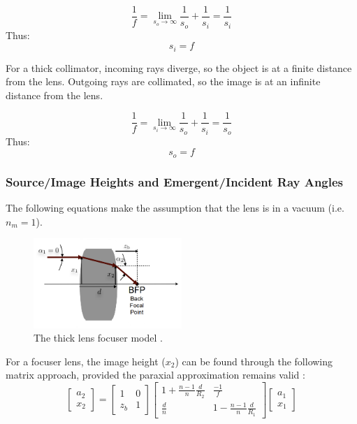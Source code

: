 \begin{equation}
    \frac{1}{f} = \lim_{s_o\to\infty} \frac{1}{s_o} + \frac{1}{s_i} = \frac{1}{s_i}
\end{equation}
Thus:
\begin{equation}
    s_i = f
\end{equation}

For a thick collimator, incoming rays diverge, so the object is at a finite distance from the lens. Outgoing rays are collimated, so the image is at an infinite distance from the lens.

\begin{equation}
    \frac{1}{f} = \lim_{s_i\to\infty} \frac{1}{s_o} + \frac{1}{s_i} = \frac{1}{s_o}
\end{equation}
Thus:
\begin{equation}
    s_o = f
\end{equation}

\subsubsection{Source/Image Heights and Emergent/Incident Ray Angles}

The following equations make the assumption that the lens is in a vacuum (i.e. $n_m=1$).

\begin{figure}[H]
\centering
\includegraphics[width=0.5\textwidth]{figures/thick-lens-focuser.png}
\caption{The thick lens focuser model \cite{MIT_Lec5}.}
\label{fig:thick-lens-focuser-model}
\end{figure}

For a focuser lens, the image height ($x_2$) can be found through the following matrix approach, provided the paraxial approximation remains valid \cite{MIT_Lec4, MIT_Lec5}:
\[ 
\begin{bmatrix} a_2\\x_2 \end{bmatrix} =
\begin{bmatrix}
1 & 0\\
z_b & 1
\end{bmatrix}
\begin{bmatrix}
1 + \frac{n-1}{n} \frac{d}{R_2} & \frac{-1}{f}\\
\frac{d}{n} & 1 - \frac{n-1}{n} \frac{d}{R_1}
\end{bmatrix}
\begin{bmatrix}
a_1\\
x_1
\end{bmatrix}
\]

